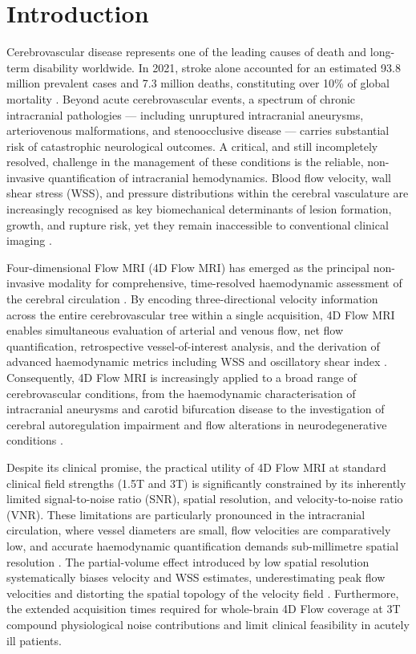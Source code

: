 \documentclass[11pt]{article}
\begin{document}
\section*{Introduction}

Cerebrovascular disease represents one of the leading causes of death and long-term disability worldwide. In 2021, stroke alone accounted for an estimated 93.8 million prevalent cases and 7.3 million deaths, constituting over 10\% of global mortality \cite{wso2025,gbd2021stroke}. Beyond acute cerebrovascular events, a spectrum of chronic intracranial pathologies --- including unruptured intracranial aneurysms, arteriovenous malformations, and stenoocclusive disease --- carries substantial risk of catastrophic neurological outcomes. A critical, and still incompletely resolved, challenge in the management of these conditions is the reliable, non-invasive quantification of intracranial hemodynamics. Blood flow velocity, wall shear stress (WSS), and pressure distributions within the cerebral vasculature are increasingly recognised as key biomechanical determinants of lesion formation, growth, and rupture risk, yet they remain inaccessible to conventional clinical imaging \cite{wahlin2022,cebral2019wss}.

Four-dimensional Flow MRI (4D Flow MRI) has emerged as the principal non-invasive modality for comprehensive, time-resolved haemodynamic assessment of the cerebral circulation \cite{markl2012,dyverfeldt2015}. By encoding three-directional velocity information across the entire cerebrovascular tree within a single acquisition, 4D Flow MRI enables simultaneous evaluation of arterial and venous flow, net flow quantification, retrospective vessel-of-interest analysis, and the derivation of advanced haemodynamic metrics including WSS and oscillatory shear index \cite{bock2010,stienen2020wss}. Consequently, 4D Flow MRI is increasingly applied to a broad range of cerebrovascular conditions, from the haemodynamic characterisation of intracranial aneurysms and carotid bifurcation disease to the investigation of cerebral autoregulation impairment and flow alterations in neurodegenerative conditions \cite{wahlin2022,sun2020cfd}.

Despite its clinical promise, the practical utility of 4D Flow MRI at standard clinical field strengths (1.5T and 3T) is significantly constrained by its inherently limited signal-to-noise ratio (SNR), spatial resolution, and velocity-to-noise ratio (VNR). These limitations are particularly pronounced in the intracranial circulation, where vessel diameters are small, flow velocities are comparatively low, and accurate haemodynamic quantification demands sub-millimetre spatial resolution \cite{markl2012,dyverfeldt2015}. The partial-volume effect introduced by low spatial resolution systematically biases velocity and WSS estimates, underestimating peak flow velocities and distorting the spatial topology of the velocity field \cite{sun2020cfd}. Furthermore, the extended acquisition times required for whole-brain 4D Flow coverage at 3T compound physiological noise contributions and limit clinical feasibility in acutely ill patients.
\end{document}
